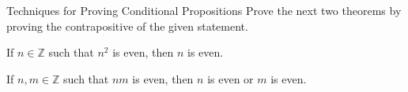 \begin{section}{Techniques for Proving Conditional Propositions}
Prove the next two theorems by proving the contrapositive of the given statement. 

\begin{theorem}\label{thm:n^2 even implies n even}
If $n\in\mathbb{Z}$ such that $n^2$ is even, then $n$ is even.
\end{theorem}

\begin{theorem}\label{thm:nm even implies n or m even}
If $n,m\in\mathbb{Z}$ such that $nm$ is even, then $n$ is even or $m$ is even.
\end{theorem}

%
%
%
%
%
%

\end{section}
